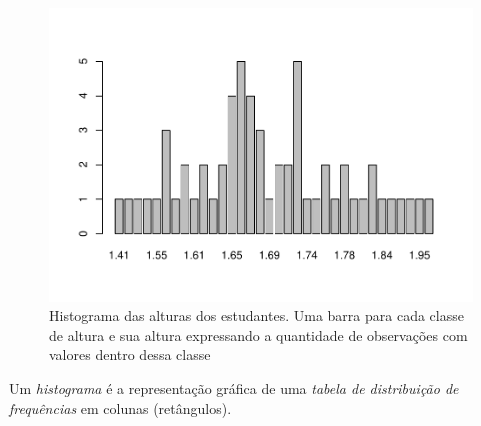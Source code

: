 \documentclass[
]{book}
\newenvironment{Shaded}{\begin{snugshade}}{\end{snugshade}}
\newcommand{\AttributeTok}[1]{\textcolor[rgb]{0.77,0.63,0.00}{#1}}
\newcommand{\DecValTok}[1]{\textcolor[rgb]{0.00,0.00,0.81}{#1}}
\newcommand{\FloatTok}[1]{\textcolor[rgb]{0.00,0.00,0.81}{#1}}
\newcommand{\FunctionTok}[1]{\textcolor[rgb]{0.00,0.00,0.00}{#1}}
\newcommand{\NormalTok}[1]{#1}
\newcommand{\SpecialCharTok}[1]{\textcolor[rgb]{0.00,0.00,0.00}{#1}}
\newcommand{\StringTok}[1]{\textcolor[rgb]{0.31,0.60,0.02}{#1}}
\begin{document}
\begin{Shaded}
\end{Shaded}

\begin{figure}
\centering
\includegraphics{apostila_files/figure-latex/unnamed-chunk-44-1.pdf}
\caption{\label{fig:unnamed-chunk-44}Histograma das alturas dos estudantes. Uma barra para cada classe de altura e sua altura expressando a quantidade de observações com valores dentro dessa classe}
\end{figure}

Um \emph{histograma} é a representação gráfica de uma \emph{tabela de distribuição de frequências} em colunas (retângulos).
\end{document}
